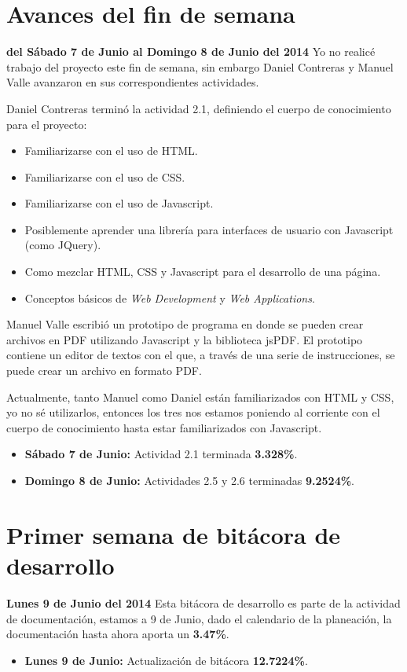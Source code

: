 \documentclass[letterpaper]{article}
\begin{document}
\section{Avances del fin de semana}
\textbf{del Sábado 7 de Junio al Domingo 8 de Junio del 2014}
Yo no realicé trabajo del proyecto este fin de semana, sin embargo Daniel Contreras y Manuel Valle avanzaron en sus correspondientes actividades.

Daniel Contreras terminó la actividad 2.1, definiendo el cuerpo de conocimiento para el proyecto:
\begin{itemize}
\item Familiarizarse con el uso de HTML.
\item Familiarizarse con el uso de CSS.
\item Familiarizarse con el uso de Javascript.
\item Posiblemente aprender una librería para interfaces de usuario con Javascript (como JQuery).
\item Como mezclar HTML, CSS y Javascript para el desarrollo de una página.
\item Conceptos básicos de \emph{Web Development} y \emph{Web Applications}.
\end{itemize}

Manuel Valle escribió un prototipo de programa en donde se pueden crear archivos en PDF utilizando Javascript y la biblioteca jsPDF. El prototipo contiene un editor de textos con el que, a través de una serie de instrucciones, se puede crear un archivo en formato PDF.

Actualmente, tanto Manuel como Daniel están familiarizados con HTML y CSS, yo no sé utilizarlos, entonces los tres nos estamos poniendo al corriente con el cuerpo de conocimiento hasta estar familiarizados con Javascript.

\begin{itemize}
\item \textbf{Sábado 7 de Junio:} Actividad 2.1 terminada \textbf{3.328\%}.
\item \textbf{Domingo 8 de Junio:} Actividades 2.5 y 2.6 terminadas \textbf{9.2524\%}.
\end{itemize}

\section{Primer semana de bitácora de desarrollo}
\textbf{Lunes 9 de Junio del 2014}
Esta bitácora de desarrollo es parte de la actividad de documentación, estamos a 9 de Junio, dado el calendario de la planeación, la documentación hasta ahora aporta un \textbf{3.47\%}.

\begin{itemize}
\item \textbf{Lunes 9 de Junio:} Actualización de bitácora \textbf{12.7224\%}.
\end{itemize}
\end{document}
